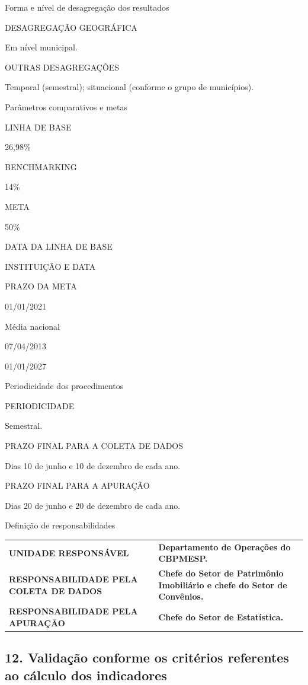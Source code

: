 \documentclass[
  letterpaper,
  DIV=11,
  numbers=noendperiod]{scrreprt}
\begin{document}
Forma e nível de desagregação dos resultados

DESAGREGAÇÃO GEOGRÁFICA

Em nível municipal.

OUTRAS DESAGREGAÇÕES

Temporal (semestral); situacional (conforme o grupo de municípios).

Parâmetros comparativos e metas

LINHA DE BASE

26,98\%

BENCHMARKING

14\%

META

50\%

DATA DA LINHA DE BASE

INSTITUIÇÃO E DATA

PRAZO DA META

01/01/2021

Média nacional

07/04/2013

01/01/2027

Periodicidade dos procedimentos

PERIODICIDADE

Semestral.

PRAZO FINAL PARA A COLETA DE DADOS

Dias 10 de junho e 10 de dezembro de cada ano.

PRAZO FINAL PARA A APURAÇÃO

Dias 20 de junho e 20 de dezembro de cada ano.

Definição de responsabilidades

\begin{longtable}[]{@{}
  >{\raggedright\arraybackslash}p{}
  >{\raggedright\arraybackslash}p{}@{}}
\toprule\noalign{}
\endhead
\bottomrule\noalign{}
\endlastfoot
\textbf{UNIDADE RESPONSÁVEL} & \textbf{Departamento de Operações do
CBPMESP.} \\
\textbf{RESPONSABILIDADE PELA COLETA DE DADOS} & \textbf{Chefe do Setor
de Patrimônio Imobiliário e chefe do Setor de Convênios.} \\
\textbf{RESPONSABILIDADE PELA APURAÇÃO} & \textbf{Chefe do Setor de
Estatística.} \\
\end{longtable}

\hypertarget{validauxe7uxe3o-conforme-os-crituxe9rios-referentes-ao-cuxe1lculo-dos-indicadores}{%
\subsection{12. Validação conforme os critérios referentes ao cálculo
dos
indicadores}\label{validauxe7uxe3o-conforme-os-crituxe9rios-referentes-ao-cuxe1lculo-dos-indicadores}}
\end{document}
